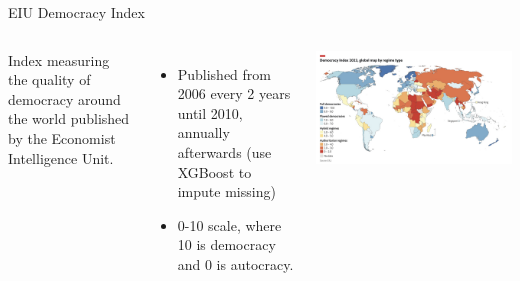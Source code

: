 \documentclass[10pt]{beamer}
\begin{document}
\begin{frame}{EIU Democracy Index}
    \begin{columns}
        Index measuring the quality of democracy around the world published by the Economist Intelligence Unit.
        \begin{itemize}
            \item Published from 2006 every 2 years until 2010, annually afterwards (use XGBoost to impute missing)
            \item 0-10 scale, where 10 is democracy and 0 is autocracy.
        \end{itemize}

        \centering
        \includegraphics[width=\textwidth]{../charts/eiu_2023.jpg}
    \end{columns}
    
\end{frame}
\end{document}
